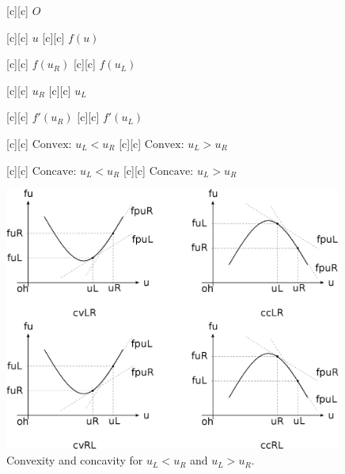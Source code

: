 \begin{figure}[ht]
	\centering
	\footnotesize

	[c] {$O$}

	[c] {$u$}
	[c] {$f(u)$}

	[c] {$f(u_{R})$}
	[c] {$f(u_{L})$}

	[c] {$u_{R}$}
	[c] {$u_{L}$}

	[c] {$f'(u_{R})$}
	[c] {$f'(u_{L})$}

	[c] {$\text{Convex: } u_{L} < u_{R}$}
	[c] {$\text{Convex: } u_{L} > u_{R}$}

	[c] {$\text{Concave: } u_{L} < u_{R}$}
	[c] {$\text{Concave: } u_{L} > u_{R}$}

	\includegraphics[width=0.99\textwidth]{convexityfu.eps}
	\caption{Convexity and concavity for $u_{L} < u_{R}$ and $u_{L} > u_{R}$.}
	\label{\LABEL}
\end{figure}